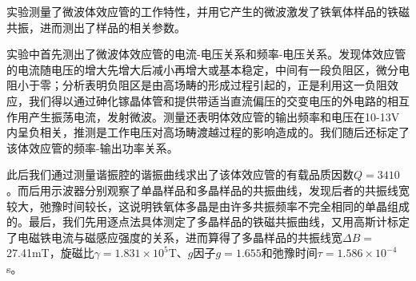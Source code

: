 \par 实验测量了微波体效应管的工作特性，并用它产生的微波激发了铁氧体样品的铁磁共振，进而测出了样品的相关参数。
\par 实验中首先测出了微波体效应管的电流-电压关系和频率-电压关系。发现体效应管的电流随电压的增大先增大后减小再增大或基本稳定，中间有一段负阻区，微分电阻小于零；分析表明负阻区是由高场畴的形成过程引起的，正是利用这一负阻效应，我们得以通过砷化镓晶体管和提供带适当直流偏压的交变电压的外电路的相互作用产生振荡电流，发射微波。测量还表明体效应管的输出频率和电压在10-13V内呈负相关，推测是工作电压对高场畴渡越过程的影响造成的。我们随后还标定了该体效应管的频率-输出功率关系。
\par 此后我们通过测量谐振腔的谐振曲线求出了该体效应管的有载品质因数$Q=3410$。而后用示波器分别观察了单晶样品和多晶样品的共振曲线，发现后者的共振线宽较大，弛豫时间较长，这说明铁氧体多晶是由许多共振频率不完全相同的单晶组成的。最后，我们先用逐点法具体测定了多晶样品的铁磁共振曲线，又用高斯计标定了电磁铁电流与磁感应强度的关系，进而算得了多晶样品的共振线宽$\Delta B=$27.41mT，旋磁比$\gamma = 1.831\times 10^5$T、$g$因子$g=1.655$和弛豫时间$\tau = 1.586\times 10^{-4}$s。